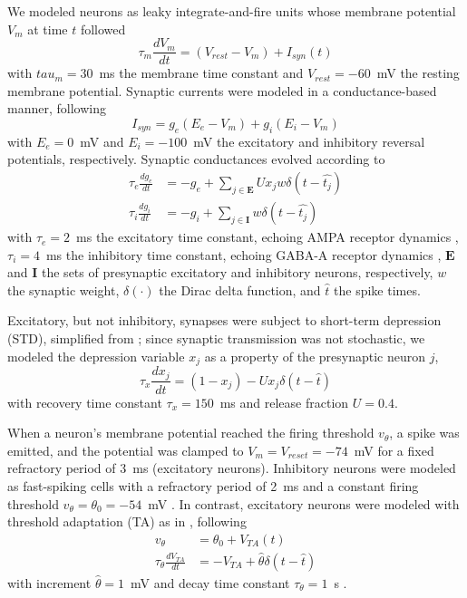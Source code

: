 \documentclass[pdflatex,referee,iicol,sn-basic]{sn-jnl}
\theoremstyle{thmstyleone}%
\theoremstyle{thmstyletwo}%
\theoremstyle{thmstylethree}%
\begin{document}
We modeled neurons as leaky integrate-and-fire units whose membrane potential $V_m$ at time $t$ followed
\begin{equation}
    \tau_m \frac{dV_m}{dt} = (V_{rest}-V_m) + I_{syn}(t)
\end{equation}
with $tau_m = 30$~ms the membrane time constant and $V_{rest} = -60$~mV the resting membrane potential. Synaptic currents were modeled in a conductance-based manner, following
\begin{equation}
    I_{syn} = g_e(E_e-V_m) + g_i(E_i-V_m)
\end{equation}
with $E_e = 0$~mV and $E_i = -100$~mV the excitatory and inhibitory reversal potentials, respectively. Synaptic conductances evolved according to
\begin{align} 
    \tau_e \frac{dg_e}{dt} &= -g_e + \sum_{j \in \boldsymbol E} U x_j w \delta(t - \hat{t_j}) \nonumber \\
    \tau_i \frac{dg_i}{dt} &= -g_i + \sum_{j \in \boldsymbol I} w \delta(t - \hat{t_j}) \label{eqn-gsyn}
\end{align}
with $\tau_e = 2$~ms the excitatory time constant, echoing AMPA receptor dynamics \citep{Hausser1997-cn}, $\tau_i = 4$~ms the inhibitory time constant, echoing GABA-A receptor dynamics \citep{Destexhe1994-oc}, $\boldsymbol E$ and $\boldsymbol I$ the sets of presynaptic excitatory and inhibitory neurons, respectively, $w$ the synaptic weight, $\delta(\cdot)$ the Dirac delta function, and $\hat{t}$ the spike times.

Excitatory, but not inhibitory, synapses were subject to short-term depression (STD), simplified from \cite{Tsodyks1997-qt}; since synaptic transmission was not stochastic, we modeled the depression variable $x_j$ as a property of the presynaptic neuron $j$,
\begin{equation}
    \tau_x \frac{dx_j}{dt} = (1-x_j) - U x_j \delta(t - \hat{t}) \label{eqn-xsyn}
\end{equation}
with recovery time constant $\tau_x = 150$~ms and release fraction $U = 0.4$.

When a neuron's membrane potential reached the firing threshold $v_\theta$, a spike was emitted, and the potential was clamped to $V_m = V_{reset} = -74$~mV for a fixed refractory period of 3~ms (excitatory neurons). Inhibitory neurons were modeled as fast-spiking cells with a refractory period of 2~ms and a constant firing threshold $v_\theta = \theta_0 = -54$~mV . In contrast, excitatory neurons were modeled with threshold adaptation (TA) as in \cite{Teeter2018-iz}, following
\begin{align}
    v_\theta &= \theta_0 + V_{TA}(t) \nonumber \\
    \tau_{\theta} \frac{dV_{TA}}{dt} &= -V_{TA} + \hat{\theta} \delta(t - \hat{t}) \label{eqn-TA}
\end{align}
with increment $\hat{\theta} = 1$~mV and decay time constant $\tau_{\theta} = 1$~s .
\end{document}
